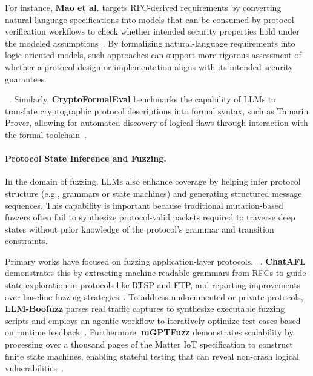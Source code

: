 For instance, \textbf{Mao et al.} targets RFC-derived requirements by converting natural-language specifications into models that can be consumed by protocol verification workflows to check whether intended security properties hold under the modeled assumptions~\cite{mao2025llm}.
By formalizing natural-language requirements into logic-oriented models, such approaches can support more rigorous assessment of whether a protocol design or implementation aligns with its intended security guarantees.

~.
Similarly, \textbf{CryptoFormalEval} benchmarks the capability of LLMs to translate cryptographic protocol descriptions into formal syntax, such as Tamarin Prover, allowing for automated discovery of logical flaws through interaction with the formal toolchain~\cite{curaba24}.

\paragraph{Protocol State Inference and Fuzzing.}
In the domain of fuzzing, LLMs also enhance coverage by helping infer protocol structure (e.g., grammars or state machines) and generating structured message sequences. 
This capability is important because traditional mutation-based fuzzers often fail to synthesize protocol-valid packets required to traverse deep states without prior knowledge of the protocol's grammar and transition constraints. 

Primary works have focused on fuzzing application-layer protocols.
~.
\textbf{ChatAFL} demonstrates this by extracting machine-readable grammars from RFCs to guide state exploration in protocols like RTSP and FTP, and reporting improvements over baseline fuzzing strategies~\cite{meng24}. 
To address undocumented or private protocols, \textbf{LLM-Boofuzz} parses real traffic captures to synthesize executable fuzzing scripts and employs an agentic workflow to iteratively optimize test cases based on runtime feedback~\cite{wang25boofuzz}. 
Furthermore, \textbf{mGPTFuzz} demonstrates scalability by processing over a thousand pages of the Matter IoT specification to construct finite state machines, enabling stateful testing that can reveal non-crash logical vulnerabilities~\cite{ma24}.


